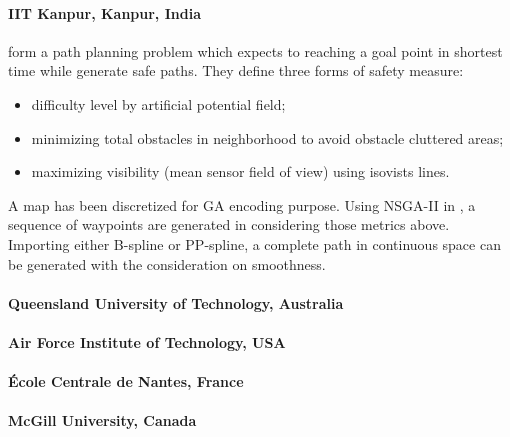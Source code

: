 \documentclass[12pt]{article}
\begin{document}
\paragraph{\textbf{IIT Kanpur, Kanpur, India}}
\cite{ahmed2011multi} form a path planning problem which expects to reaching a goal point in shortest time while generate safe paths. They define three forms of safety measure:
\begin{itemize}
\item difficulty level by artificial potential field;
\item minimizing total obstacles in neighborhood to avoid obstacle cluttered areas;
\item maximizing visibility (mean sensor field of view) using isovists lines.
\end{itemize}
A map has been discretized for GA encoding purpose. Using NSGA-II in \cite{deb2002fast}, a sequence of waypoints are generated in considering those metrics above. Importing either B-spline or PP-spline, a complete path in continuous space can be generated with the consideration on smoothness.

\paragraph{\textbf{Queensland University of Technology, Australia}}
\cite{wu2007fuzzy} \cite{wu2011multi}

\paragraph{\textbf{Air Force Institute of Technology, USA}}
\cite{Pohl:2008:MUM:1516744.1516965}

\paragraph{\textbf{École Centrale de Nantes, France}}
\cite{ur2010multi}

\paragraph{\textbf{McGill University, Canada}}
\cite{higuera2012socially}



\end{document}

